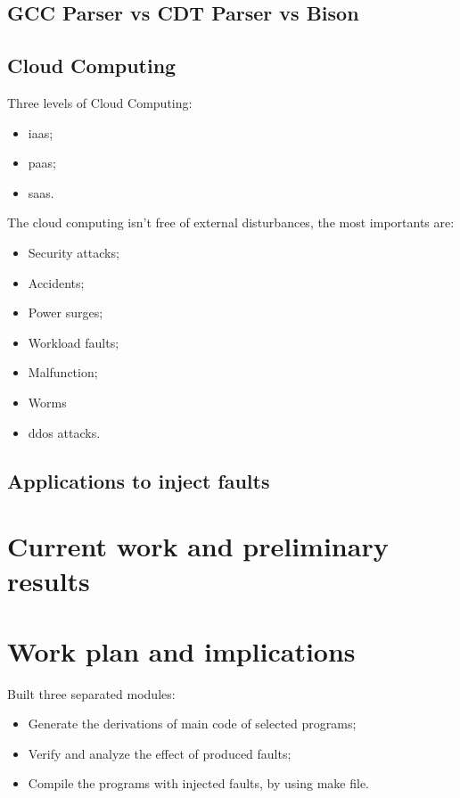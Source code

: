 \subsection{GCC Parser vs CDT Parser vs Bison}


\subsection{Cloud Computing}

Three levels of Cloud Computing:

\begin{itemize}
	\item \ac{iaas};
	\item \ac{paas};
	\item \ac{saas}.
\end{itemize}

The cloud computing isn't free of external disturbances\cite{wolter2012resilience}, the most importants are:
\begin{itemize}
 	\item Security attacks;
 	\item Accidents;
 	\item Power surges;
 	\item Workload faults;
 	\item Malfunction;
 	\item Worms
 	\item \ac{ddos} attacks.
 \end{itemize}

\subsection{Applications to inject faults}

\newpage
\section{Current work and preliminary results}

\newpage
\section{Work plan and implications}

Built three separated modules:

\begin{itemize}
	\item Generate the derivations of main code of selected programs;
	\item Verify and analyze the effect of produced faults;
	\item Compile the programs with injected faults, by using make file.
\end{itemize}

